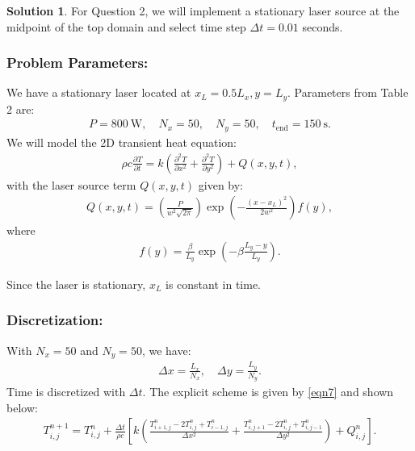 \documentclass[12pt]{article}
\theoremstyle{definition} %
\newtheorem{solution}{Solution}
\theoremstyle{plain} %
\begin{document}
\begin{solution}
    \noindent

        For Question 2, we will implement a stationary laser source at the midpoint of the top domain and select time step $\Delta t = 0.01$ seconds.


            \subsubsection*{Problem Parameters:}  
            We have a stationary laser located at $ x_L = 0.5L_x, y = L_y $. Parameters from Table 2 are:
            \begin{align}
            P = 800\ \text{W}, \quad N_x = 50, \quad N_y = 50, \quad t_\text{end} = 150\ \text{s}.
            \end{align}
            We will model the 2D transient heat equation:
            \begin{align}
            \rho c \frac{\partial T}{\partial t} = k\left( \frac{\partial^2 T}{\partial x^2} + \frac{\partial^2 T}{\partial y^2} \right) + Q(x,y,t),
            \end{align}
            with the laser source term $ Q(x,y,t) $ given by:
            \begin{align}
            Q(x,y,t) = \left(\frac{P}{w^2 \sqrt{2\pi}}\right)\exp\left(-\frac{(x - x_L)^2}{2w^2}\right)f(y),
            \end{align}
            where
            \begin{align}
            f(y) = \frac{\beta}{L_y}\exp\left(-\beta\frac{L_y - y}{L_y}\right).
            \end{align}
        
            Since the laser is stationary, $ x_L $ is constant in time.
        
            \subsubsection*{Discretization:}  
            With $ N_x = 50 $ and $ N_y = 50 $, we have:
            \begin{align}
            \Delta x = \frac{L_x}{N_x}, \quad \Delta y = \frac{L_y}{N_y}.
            \end{align}
            Time is discretized with $\Delta t$. The explicit scheme is given by \autoref{eqn7} and shown below:
            \begin{align}
            T_{i,j}^{n+1} = T_{i,j}^n + \frac{\Delta t}{\rho c}\left[ k\left(\frac{T_{i+1,j}^n - 2T_{i,j}^n + T_{i-1,j}^n}{\Delta x^2} + \frac{T_{i,j+1}^n - 2T_{i,j}^n + T_{i,j-1}^n}{\Delta y^2}\right) + Q_{i,j}^n \right].
            \end{align}
        

\end{solution}
\end{document}
